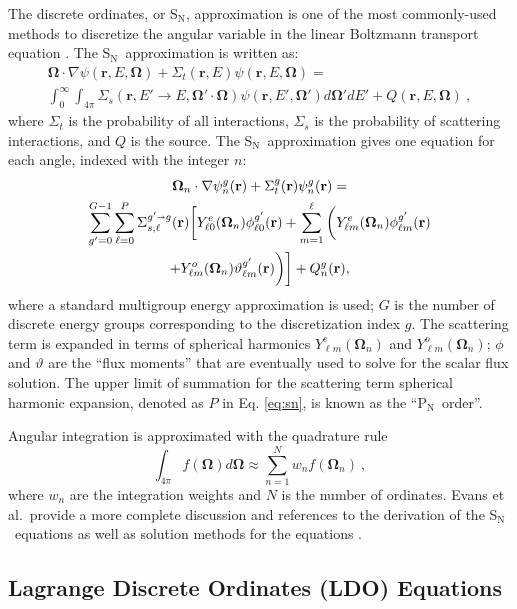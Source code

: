 \documentclass{article} %
\newcommand{\bo}{\mathbf\Omega}
\newcommand{\vecr}{\textbf{r}}
\newcommand{\sn}{S$_\mathrm{N}$}
\newcommand{\pn}{P$_\mathrm{N}$}
\newcommand{\Ye}[2]{\ensuremath{Y^e_{#1}(\bo_#2)}}
\newcommand{\Yo}[2]{\ensuremath{Y^o_{#1}(\bo_#2)}}
\newcommand{\sa}{\shortrightarrow}
\begin{document}
The discrete ordinates, or \sn, approximation is one of the most commonly-used
methods to discretize the angular variable in the linear Boltzmann
transport equation \cite{bg}. The \sn\ approximation is written as:
%
\begin{multline}
\bo \cdot \nabla \psi(\vecr,E,\bo) + \Sigma_t(\vecr,E) \psi(\vecr,E,\bo) = \\
\int_0^\infty\int_{4\pi} \Sigma_s(\vecr,E'\rightarrow E,\bo'\cdot\bo)
\psi(\vecr,E',\bo')d\bo'dE' + Q(\vecr,E,\bo) \:,
\label{eq:bte}
\end{multline}
%
where $\Sigma_t$ is the probability of all interactions, $\Sigma_s$ is the
probability of scattering interactions, and $Q$ is the source. The \sn\
approximation gives one equation for each angle, indexed with the integer $n$:
%
\begin{multline}
\bo_n \cdot \nabla \psi_n^g(\vecr) + \Sigma_t^g(\vecr)\psi_n^g(\vecr) = \\
\sum_{g'=0}^{G-1}\sum_{\ell=0}^{P}\Sigma_{s,\ell}^{g'\sa g}(\vecr)
\bigg[\Ye{\ell 0}{n}\phi_{\ell 0}^{g'}(\vecr) + \sum_{m=1}^{\ell}
\bigg(\Ye{\ell m}{n}\phi_{\ell m}^{g'}(\vecr) \\
 + \Yo{\ell m}{n}\vartheta_{\ell m}^{g'}(\vecr)\bigg)\bigg]
+ Q_n^g(\vecr),
\label{eq:sn}
\end{multline}
%
where a standard multigroup energy approximation is used; $G$ is the
number of discrete energy groups corresponding to the discretization index
$g$. The scattering term is expanded in terms of spherical harmonics
$\Ye{\ell m}{n}$ and $\Yo{\ell m}{n}$; $\phi$ and $\vartheta$ are the
``flux moments'' that are eventually used to solve for the scalar flux
solution. The upper limit of summation for the scattering term spherical
harmonic expansion, denoted as $P$ in Eq. \eqref{eq:sn}, is known as the
``\pn\ order''.

Angular integration is approximated with the quadrature rule 
%
\begin{equation}
\int_{4\pi} f\left(\bo\right) d\bo \approx \sum_{n=1}^{N}w_n f\left(\bo_n\right)\:,
\label{eq:quadrule}
\end{equation}
%
where $w_n$ are the integration weights and $N$ is the number of ordinates.
Evans et al.\ provide a more complete discussion and references to the
derivation of the \sn\ equations as well as solution methods for the equations
\cite{denovo}.

\subsection{Lagrange Discrete Ordinates (LDO) Equations}
\end{document}
